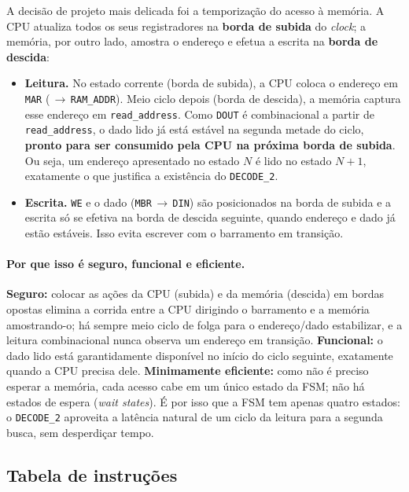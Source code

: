 \documentclass[12pt,a4paper]{article}
\begin{document}
A decisão de projeto mais delicada foi a temporização do acesso à memória. A CPU atualiza
todos os seus registradores na \textbf{borda de subida} do \textit{clock}; a memória, por
outro lado, amostra o endereço e efetua a escrita na \textbf{borda de descida}:

\begin{itemize}
    \item \textbf{Leitura.} No estado corrente (borda de subida), a CPU coloca o endereço em
          \texttt{MAR} (\,$\to$\,\texttt{RAM\_ADDR}). Meio ciclo depois (borda de descida),
          a memória captura esse endereço em \texttt{read\_address}. Como \texttt{DOUT} é
          combinacional a partir de \texttt{read\_address}, o dado lido já está estável na
          segunda metade do ciclo, \textbf{pronto para ser consumido pela CPU na próxima
          borda de subida}. Ou seja, um endereço apresentado no estado $N$ é lido no estado
          $N+1$, exatamente o que justifica a existência do \texttt{DECODE\_2}.
    \item \textbf{Escrita.} \texttt{WE} e o dado (\texttt{MBR}\,$\to$\,\texttt{DIN}) são
          posicionados na borda de subida e a escrita só se efetiva na borda de descida
          seguinte, quando endereço e dado já estão estáveis. Isso evita escrever com o
          barramento em transição.
\end{itemize}

\paragraph{Por que isso é seguro, funcional e eficiente.}
\textbf{Seguro:} colocar as ações da CPU (subida) e da memória (descida) em bordas opostas
elimina a corrida entre a CPU dirigindo o barramento e a memória amostrando-o; há sempre
meio ciclo de folga para o endereço/dado estabilizar, e a leitura combinacional nunca
observa um endereço em transição. \textbf{Funcional:} o dado lido está garantidamente
disponível no início do ciclo seguinte, exatamente quando a CPU precisa dele.
\textbf{Minimamente eficiente:} como não é preciso esperar a memória, cada acesso cabe em um
único estado da FSM; não há estados de espera (\textit{wait states}). É por isso que a FSM
tem apenas quatro estados: o \texttt{DECODE\_2} aproveita a latência natural de um ciclo
da leitura para a segunda busca, sem desperdiçar tempo.

\subsection{Tabela de instruções}
\end{document}
